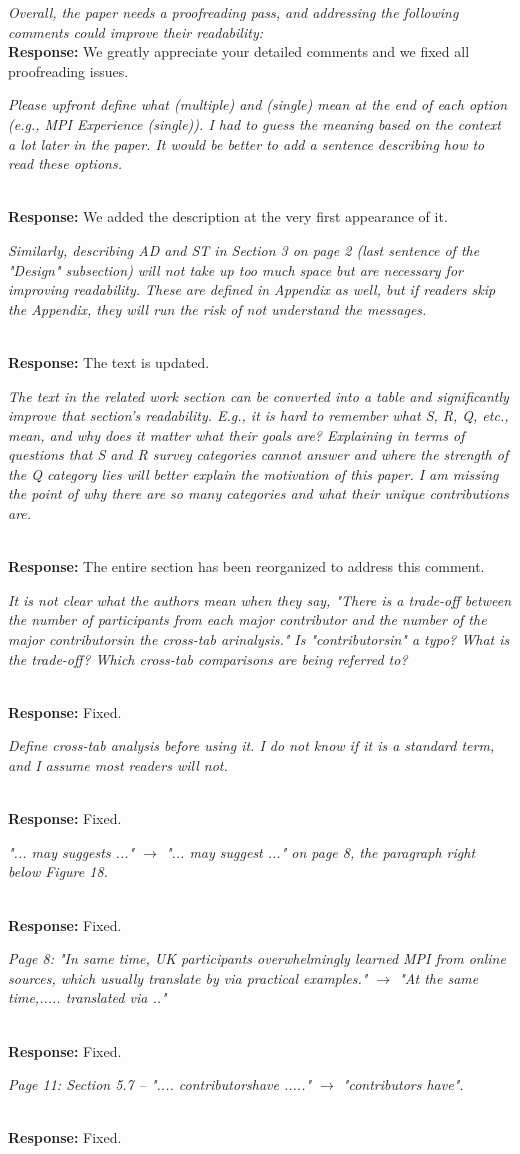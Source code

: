 \documentclass[11pt]{article}
\newcommand{\response}[2]{{\vspace{5mm}\noindent{\bf Comment:} \em #1}\\%
  {\bf Response:} #2}
\newcommand{\iresponse}[2]{{\item \em #1}\\%
  {\bf Response:} #2}
\begin{document}
\response{
Overall, the paper needs a proofreading pass, and addressing the
following comments could improve their readability:
}
{We greatly appreciate your detailed comments and we fixed all
  proofreading issues.}


\begin{enumerate}
\iresponse{Please upfront define what (multiple) and (single) mean at the end
of each option (e.g., MPI Experience (single)). I had to guess the
meaning based on the context a lot later in the paper. It would be
better to add a sentence describing how to read these
options.}
          {We added the description at the very first appearance of it.}

\iresponse{Similarly, describing AD and ST in Section 3 on page 2 (last
sentence of the "Design" subsection) will not take up too much space
but are necessary for improving readability. These are defined in
Appendix as well, but if readers skip the Appendix, they will run the
risk of not understand the messages.}
{The text is updated.}

\iresponse{The text in the related work section can be converted into a table
and significantly improve that section's readability. E.g., it is hard
to remember what S, R, Q, etc., mean, and why does it matter what
their goals are? Explaining in terms of questions that S and R survey
categories cannot answer and where the strength of the Q category lies
will better explain the motivation of this paper. I am missing the
point of why there are so many categories and what their unique
contributions are.}
{The entire section has been reorganized to address this comment.}

\iresponse{It is not clear what the authors mean when they say, "There is a
trade-off between the number of participants from each major
contributor and the number of the major contributorsin the cross-tab
arinalysis." Is "contributorsin" a typo? What is the trade-off? Which
cross-tab comparisons are being referred to? }
{Fixed.}

\iresponse{Define cross-tab analysis before using it. I do not know if it is a
standard term, and I assume most readers will not.}
{Fixed.}

\iresponse{"... may suggests ..." $\to$ "... may suggest ..." on page 8, the
  paragraph right below Figure 18.}
{Fixed.}

\iresponse{Page 8: "In same time, UK participants overwhelmingly learned MPI
from online sources, which usually translate by via practical
examples." $\to$ "At the same time,..... translated via .."}
{Fixed.}

\iresponse{Page 11: Section 5.7 -- ".... contributorshave ....." $\to$
  "contributors have".}
{Fixed.}

\end{enumerate}
\end{document}
